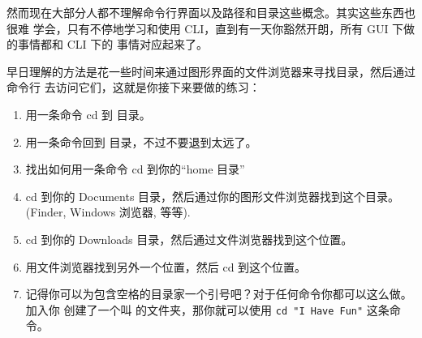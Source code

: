 然而现在大部分人都不理解命令行界面以及路径和目录这些概念。其实这些东西也很难
学会，只有不停地学习和使用 CLI，直到有一天你豁然开朗，所有 GUI 下做的事情都和 CLI 下的
事情对应起来了。

早日理解的方法是花一些时间来通过图形界面的文件浏览器来寻找目录，然后通过命令行
去访问它们，这就是你接下来要做的练习：

\begin{enumerate}
\item 用一条命令 cd 到  目录。
\item 用一条命令回到  目录，不过不要退到太远了。
\item 找出如何用一条命令 cd 到你的“home 目录”
\item cd 到你的 Documents 目录，然后通过你的图形文件浏览器找到这个目录。(Finder, Windows 浏览器, 等等).
\item cd 到你的 Downloads 目录，然后通过文件浏览器找到这个位置。
\item 用文件浏览器找到另外一个位置，然后 cd 到这个位置。
\item 记得你可以为包含空格的目录家一个引号吧？对于任何命令你都可以这么做。加入你
创建了一个叫  的文件夹，那你就可以使用 \verb|cd "I Have Fun"| 这条命令。
\end{enumerate}

